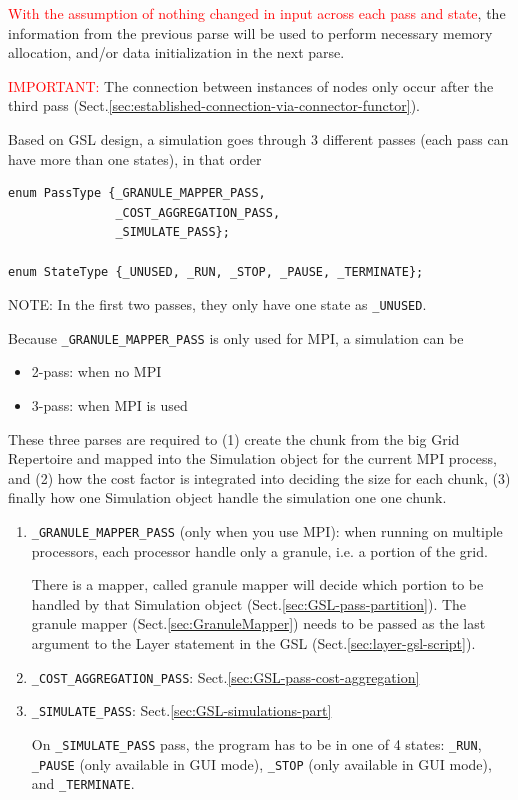 \textcolor{red}{With the assumption of nothing changed in input across each pass
and state}, the information from the previous parse will be used to perform
necessary memory allocation, and/or data initialization in the next parse.

\textcolor{red}{IMPORTANT:} The connection between instances of nodes only occur
after the third pass (Sect.\ref{sec:established-connection-via-connector-functor}). 


Based on GSL design, a simulation goes through 3 different passes (each pass
can have more than one states), in that order
{\small
\begin{verbatim}
enum PassType {_GRANULE_MAPPER_PASS, 
               _COST_AGGREGATION_PASS, 
               _SIMULATE_PASS};

enum StateType {_UNUSED, _RUN, _STOP, _PAUSE, _TERMINATE}; 

\end{verbatim}
} 
NOTE: In the first two passes, they only have one state as
\verb!_UNUSED!.


Because \verb!_GRANULE_MAPPER_PASS! is only used for MPI, a simulation can be 
\begin{itemize}
  \item 2-pass: when no MPI
  
  \item 3-pass: when MPI is used
\end{itemize}

These three parses are required to  (1) create the chunk from the big Grid
Repertoire and mapped into the Simulation object for the current MPI process,
and (2) how the cost factor is integrated into deciding the size for each chunk,
(3) finally how one Simulation object handle the simulation one one chunk.

\begin{enumerate}
  \item \verb!_GRANULE_MAPPER_PASS! (only when you use MPI): when running on multiple
  processors, each processor handle only  a granule, i.e. a portion of the
  grid. 
  
  There is a mapper, called granule mapper will decide which portion to be
  handled by that Simulation object (Sect.\ref{sec:GSL-pass-partition}). The
  granule mapper (Sect.\ref{sec:GranuleMapper}) needs to be passed as the last
  argument to the Layer statement in the GSL (Sect.\ref{sec:layer-gsl-script}).
  
  \item \verb!_COST_AGGREGATION_PASS!: Sect.\ref{sec:GSL-pass-cost-aggregation}
  
  
  \item \verb!_SIMULATE_PASS!: Sect.\ref{sec:GSL-simulations-part}


On \verb!_SIMULATE_PASS! pass, the program has to be in one of 4
states: \verb!_RUN!, \verb!_PAUSE! (only available in GUI mode), \verb!_STOP!
(only available in GUI mode), and \verb!_TERMINATE!.
\end{enumerate}


